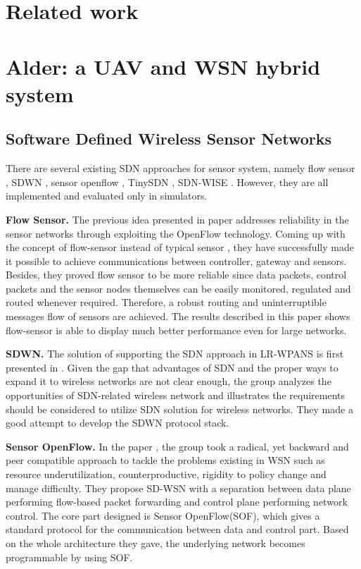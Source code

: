 \section{Related work}

\section{Alder: a UAV and WSN hybrid system}


\subsection{Software Defined Wireless Sensor Networks}


There are several existing SDN approaches for sensor system, 
namely flow sensor \cite{mahmud2011exploitation}, SDWN \cite{costanzo2012software},
sensor openflow \cite{luo2012sensor}, TinySDN \cite{de2015tinysdn}, SDN-WISE \cite{galluccio2015sdn}.
However, they are all implemented and evaluated only in simulators. 

\textbf{Flow Sensor.}
The previous idea presented in paper \cite{mahmud2011exploitation} addresses 
reliability in the sensor networks through exploiting the OpenFlow technology\cite{Mckeown2008OpenFlow}. 
Coming up with the concept of flow-sensor instead of typical sensor \cite{Liu2015Thermoresistive}, 
they have successfully made it possible to achieve communications between controller, 
gateway and sensors. Besides, they proved flow sensor to be more 
reliable since data packets, control packets and the sensor nodes 
themselves can be easily monitored, regulated and routed whenever 
required. Therefore, a robust routing and uninterruptible messages 
flow of sensors are achieved. The results described in this paper 
shows flow-sensor is able to display much better performance even for large networks.

\textbf{SDWN.}
The solution of supporting the SDN approach in LR-WPANS is first presented in \cite{costanzo2012software}. 
Given the gap that advantages of SDN and the proper ways to expand it to wireless networks are not clear enough, 
the group analyzes the opportunities of SDN-related wireless network and illustrates 
the requirements should be considered to utilize SDN solution for wireless networks. 
They made a good attempt to develop the SDWN protocol stack.

\textbf{Sensor OpenFlow.}
In the paper \cite{luo2012sensor}, the group took a radical, yet backward 
and peer compatible approach to tackle the problems existing in WSN 
such as resource underutilization, counterproductive, rigidity to policy 
change and manage difficulty. They propose SD-WSN with a separation between 
data plane performing flow-based packet forwarding and control plane performing network control. 
The core part designed is Sensor OpenFlow(SOF), which gives a standard protocol for the communication 
between data and control part. Based on the whole architecture they gave, 
the underlying network becomes programmable by using SOF.

